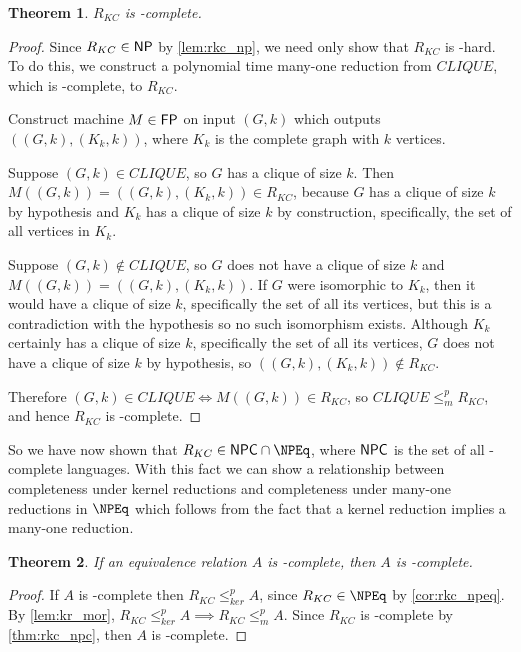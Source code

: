 \documentclass{article}
\newtheorem{theorem}{Theorem}%
\theoremstyle{definition}
\newcommand{\kr}{\leq^{p}_{ker}} %
\newcommand{\mor}{\leq^{p}_{m}} %
\begin{document}
\begin{theorem}\label{thm:rkc_npc}$R_{KC}$ is \NP-complete.\end{theorem}
\begin{proof}
  Since $R_{KC}\in{\ensuremath{\mathsf{NP}}}$ by \autoref{lem:rkc_np}, we need only show that $R_{KC}$
  is \NP-hard. To do this, we construct a polynomial time many-one reduction
  from $CLIQUE$, which is \NP-complete, to $R_{KC}$.

  Construct machine $M\in{\ensuremath{\mathsf{FP}}}$ on input $(G, k)$ which outputs $((G, k), (K_k,
  k))$, where $K_k$ is the complete graph with $k$ vertices.

  Suppose $(G,k)\in CLIQUE$, so $G$ has a clique of size $k$. Then
  $M((G,k))=((G,k), (K_k, k))\in R_{KC}$, because $G$ has a clique of size
  $k$ by hypothesis and $K_k$ has a clique of size $k$ by construction,
  specifically, the set of all vertices in $K_k$.
  
  Suppose $(G,k)\notin CLIQUE$, so $G$ does not have a clique of size $k$ and
  $M((G,k))=((G,k), (K_k, k))$. If $G$ were isomorphic to $K_k$, then it would
  have a clique of size $k$, specifically the set of all its vertices, but this
  is a contradiction with the hypothesis so no such isomorphism
  exists. Although $K_k$ certainly has a clique of size $k$, specifically the
  set of all its vertices, $G$ does not have a clique of size $k$ by
  hypothesis, so $((G, k), (K_k, k))\notin R_{KC}$.
  
  Therefore $(G,k)\in CLIQUE\iff M((G,k))\in R_{KC}$, so $CLIQUE\mor R_{KC}$,
  and hence $R_{KC}$ is \NP-complete.
\end{proof}

So we have now shown that $R_{KC}\in\NPC\cap\NPEq$, where ${\mathsf{NPC}}$ is the set of
all \NP-complete languages. With this fact we can show a relationship between
completeness under kernel reductions and completeness under many-one reductions
in $\NPEq$ which follows from the fact that a kernel reduction implies a
many-one reduction.

\begin{theorem}\label{thm:npeqc_npc}If an equivalence relation $A$ is
  \NPEq-complete, then $A$ is \NP-complete.\end{theorem}
\begin{proof}
  If $A$ is \NPEq-complete then $R_{KC}\kr A$, since $R_{KC}\in\NPEq$ by
  \autoref{cor:rkc_npeq}. By \autoref{lem:kr_mor}, $R_{KC}\kr A\implies
  R_{KC}\mor A$. Since $R_{KC}$ is \NP-complete by \autoref{thm:rkc_npc}, then
  $A$ is \NP-complete.
\end{proof}
\end{document}

